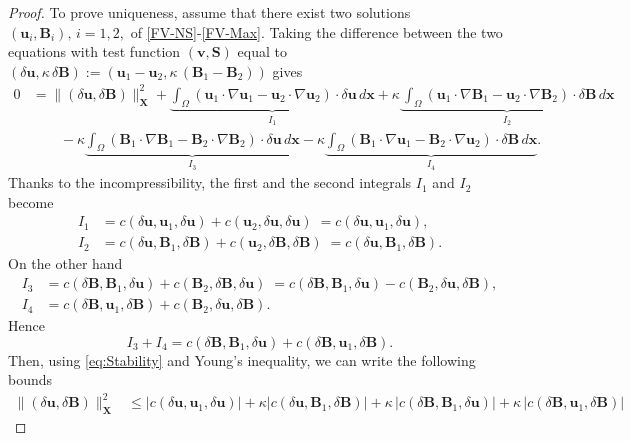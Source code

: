 \documentclass[3p]{elsarticle}
\def\V#1{\mathbf{#1}}
\def\VX{\mathbf{X}}
\begin{document}
\begin{proof}
To prove uniqueness, assume that there exist two solutions $(\V{u}_i,\V{B}_i),\, i=1,2,$ of \eqref{FV-NS}-\eqref{FV-Max}. Taking the difference between the two equations with test function $(\V{v},\V{S})$ equal to $(\delta \V{u},\kappa \,\delta \V{B} ) := (\V{u}_1-\V{u}_2,\kappa \, (\V{B}_1 - \V{B}_2))$ gives
\begin{align*}
0 & = \|(\delta \V{u},\delta \V{B})\|^2_\VX 
+ \underbrace{\int_\Omega \left( \V{u}_1 \cdot \nabla \V{u}_1  - 
\V{u}_2 \cdot \nabla \V{u}_2 \right) \cdot \delta \V{u} \, d\V{x} 
}_{I_1}
+ 
\kappa \underbrace{ \,\int_\Omega \left( \V{u}_1 \cdot \nabla \V{B}_1 
- \V{u}_2 \cdot \nabla \V{B}_2 \right) 
\cdot   \delta \V{B} \, d\V{x}
}_{I_2}
\\
& \qquad 
- \kappa \underbrace{\int_\Omega \left( \V{B}_1\cdot \nabla \V{B}_1-
\V{B}_2\cdot \nabla \V{B}_2\right)  \cdot \delta \V{u} \, d\V{x} }_{I_3}   
- \kappa \underbrace{\int_\Omega \left( \V{B}_1 \cdot \nabla \V{u}_1 -\V{B}_2 \cdot \nabla \V{u}_2 \right)
\cdot \delta \V{B} \, d\V{x}}_{I_4}. 
\end{align*}
Thanks to the incompressibility, the first and the second integrals $I_1$ and $I_2$ become 
%
\begin{align*}
I_1 & = 
c(\delta\V{u},\V{u}_1,\delta \V{u})
+ c( \V{u}_2,\delta \V{u},\delta \V{u})
\; = c(\delta \V{u}, \V{u}_1,\delta \V{u}), \\
I_2 
& = c(\delta  \V{u},\V{B}_1, \delta \V{B})
+  c(\V{u}_2,\delta \V{B},\delta \V{B}) \; = 
 c(\delta \V{u},\V{B}_1,\delta \V{B}). 
\end{align*}
On the other hand
\begin{align*}
I_3 & =
c(\delta \V{B}, \V{B}_1, \delta \V{u} )
+ c(\V{B}_2,\delta \V{B},\delta \V{u}) \; = 
 c(\delta \V{B}, \V{B}_1,\delta \V{u})
- c(\V{B}_2,\delta \V{u},\delta \V{B}),
\\
I_4 &= c(\delta \V{B},\V{u}_1,\delta \V{B})
+ c(\V{B}_2,\delta \V{u},\delta \V{B}). 
\end{align*}
Hence 
$$
I_3 + I_4 = 
c(\delta \V{B}, \V{B}_1,\delta \V{u})
 + c(\delta \V{B},\V{u}_1,\delta \V{B}). 
$$
Then, using \eqref{eq:Stability} and Young's inequality, we can write the following bounds
\begin{align*}
\|(\delta \V{u},\delta \V{B})\|^2_\VX 
& \le 
\left| c(\delta \V{u},\V{u}_1,\delta \V{u}) \right|
+ \kappa \left|  c(\delta \V{u},\V{B}_1, \delta \V{B}) \right| 
+  \kappa\,\left| c(\delta \V{B},\V{B}_1,\delta \V{u}) \right|
 + \kappa\, \left| c(\delta \V{B},\V{u}_1,\delta \V{B})\right|

\end{align*}
\end{proof}
\end{document}

